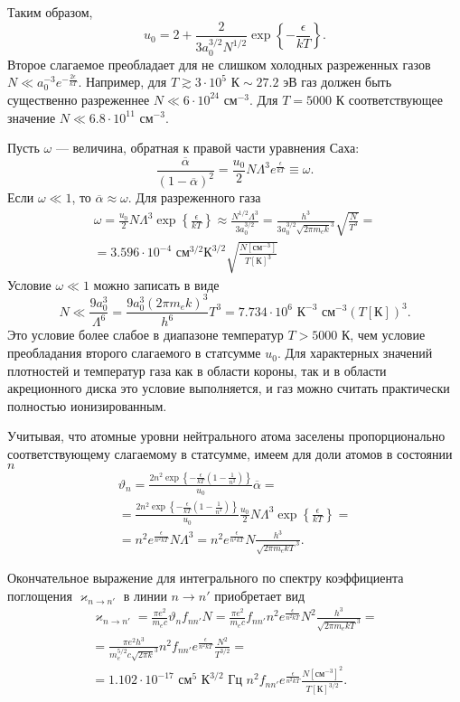 Таким образом,
\[
u_0 = 2 + \frac{2}{3a_0^{3/2} N^{1/2}} \exp\left\{-\frac{\epsilon}{kT}\right\}.
\]
Второе слагаемое преобладает для не слишком холодных разреженных газов $N \ll a_0^{-3}e^{-\frac{2\epsilon}{kT}}$. Например, для $T \gtrsim 3\cdot 10^5 \text{ К} \sim 27.2 \text{ эВ}$ газ должен быть существенно разреженнее $N \ll 6 \cdot 10^{24} \text { см}^{-3}$. Для $T = 5000 \text{ К}$ соответствующее значение $N \ll 6.8 \cdot 10^{11} \text{ см}^{-3}$.

Пусть $\omega$ --- величина, обратная к правой части уравнения Саха:
\[
\frac{\overline{\alpha}}{(1-\overline{\alpha})^2} = \frac{u_0}{2} N\Lambda^3 e^{\frac{\epsilon}{kT}} \equiv \omega.
\]
Если $\omega \ll 1$, то $\overline{\alpha} \approx \omega$. Для разреженного газа
\begin{multline*}
\omega = \frac{u_0}{2} N\Lambda^3 \exp\left\{\frac{\epsilon}{kT}\right\} \approx
\frac{N^{1/2} \Lambda^3}{3a_0^{3/2}} 
= \frac{h^3}{3a_0^{3/2}\sqrt{2\pi m_e k}^3} \sqrt{\frac{N}{T^3}} = \\
= 3.596\cdot 10^{-4} \text{ см}^{3/2}\text{К}^{3/2} \sqrt{\frac{N [\text{см}^{-3}]}{T [\text{К}]^3}}
\end{multline*}
Условие $\omega \ll 1$ можно записать в виде
\[
N \ll \frac{9a_0^3}{\Lambda^6} = \frac{9a_0^3 (2\pi m_e k)^3}{h^6} T^3 = 7.734 \cdot 10^6 \text{ К}^{-3} \text{ см}^{-3} (T [\text{К}])^3.
\]
Это условие более слабое в диапазоне температур $T > 5000 \text{ К}$, чем условие преобладания второго слагаемого в статсумме $u_0$. Для характерных значений плотностей и температур газа как в области короны, так и в области акреционного диска это условие выполняется, и газ можно считать практически полностью ионизированным.

Учитывая, что атомные уровни нейтрального атома заселены пропорционально соответствующему слагаемому в статсумме, имеем для доли атомов в состоянии $n$
\begin{multline*}
\vartheta_n = \frac{2n^2\exp\left\{-\frac{\epsilon}{kT}\left(1 - \frac{1}{n^2}\right)\right\}}{u_0} \overline{\alpha} = \\ =
\frac{2n^2\exp\left\{-\frac{\epsilon}{kT}\left(1 - \frac{1}{n^2}\right)\right\}}{u_0}\frac{u_0}{2} N\Lambda^3 \exp\left\{\frac{\epsilon}{kT}\right\} = \\ =
n^2e^\frac{\epsilon}{n^2kT} N\Lambda^3 = 
n^2e^\frac{\epsilon}{n^2kT} N\frac{h^3}{\sqrt{2\pi m_e kT}^3}.
\end{multline*}

Окончательное выражение для интегрального по спектру коэффициента поглощения $\varkappa_{n \to n'}$ в линии $n \to n'$ приобретает вид
\begin{multline*}
\varkappa_{n \to n'} = \frac{\pi e^2}{m_ec} \vartheta_n f_{nn'} N = 
\frac{\pi e^2}{m_ec} f_{nn'} n^2e^\frac{\epsilon}{n^2kT} N^2\frac{h^3}{\sqrt{2\pi m_e kT}^3} = \\
= \frac{\pi e^2 h^3}{m_e^{5/2} c\sqrt{2\pi k}^3} n^2f_{nn'} e^\frac{\epsilon}{n^2kT} \frac{N^2}{T^{3/2}} = \\ =
1.102\cdot 10^{-17} \text{ см}^5 \text{ К}^{3/2} \text{ Гц } n^2f_{nn'} e^\frac{\epsilon}{n^2kT} \frac{N [\text{см}^{-3}]^2}{T[\text{К}]^{3/2}}.
\end{multline*}

